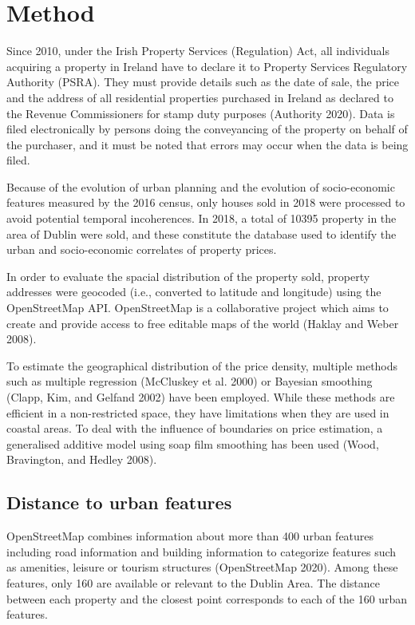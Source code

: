 \documentclass[conference,final,]{IEEEtran}
\begin{document}
\hypertarget{method}{%
\section{Method}\label{method}}

Since 2010, under the Irish Property Services (Regulation) Act, all individuals acquiring a property in Ireland have to declare it to Property Services Regulatory Authority (PSRA). They must provide details such as the date of sale, the price and the address of all residential properties purchased in Ireland as declared to the Revenue Commissioners for stamp duty purposes (Authority 2020). Data is filed electronically by persons doing the conveyancing of the property on behalf of the purchaser, and it must be noted that errors may occur when the data is being filed.

Because of the evolution of urban planning and the evolution of socio-economic features measured by the 2016 census, only houses sold in 2018 were processed to avoid potential temporal incoherences. In 2018, a total of 10395 property in the area of Dublin were sold, and these constitute the database used to identify the urban and socio-economic correlates of property prices.

In order to evaluate the spacial distribution of the property sold, property addresses were geocoded (i.e., converted to latitude and longitude) using the OpenStreetMap API. OpenStreetMap is a collaborative project which aims to create and provide access to free editable maps of the world (Haklay and Weber 2008).

To estimate the geographical distribution of the price density, multiple methods such as multiple regression (McCluskey et al. 2000) or Bayesian smoothing (Clapp, Kim, and Gelfand 2002) have been employed. While these methods are efficient in a non-restricted space, they have limitations when they are used in coastal areas. To deal with the influence of boundaries on price estimation, a generalised additive model using soap film smoothing has been used (Wood, Bravington, and Hedley 2008).

\hypertarget{distance-to-urban-features}{%
\subsection{Distance to urban features}\label{distance-to-urban-features}}

OpenStreetMap combines information about more than 400 urban features including road information and building information to categorize features such as amenities, leisure or tourism structures (OpenStreetMap 2020). Among these features, only 160 are available or relevant to the Dublin Area. The distance between each property and the closest point corresponds to each of the 160 urban features.
\end{document}
